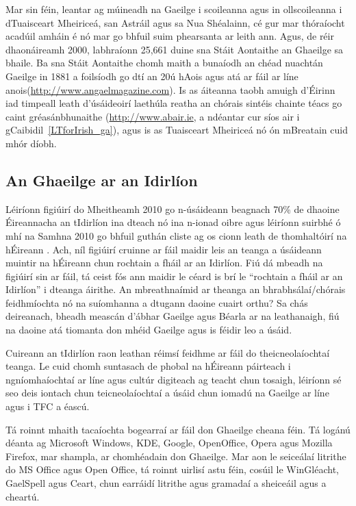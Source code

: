 \begin{multicols}{2}
Mar sin féin, leantar ag múineadh na Gaeilge i scoileanna agus in ollscoileanna i dTuaisceart Mheiriceá, san Astráil agus sa Nua Shéalainn, cé gur mar thóraíocht acadúil amháin é nó mar go bhfuil suim phearsanta ar leith ann. Agus, de réir dhaonáireamh 2000, labhraíonn 25,661 duine sna Stáit Aontaithe an Ghaeilge sa bhaile. Ba sna Stáit Aontaithe chomh maith a bunaíodh an chéad nuachtán Gaeilge in 1881 a foilsíodh go dtí an 20ú hAois agus atá ar fáil ar líne anois(\url{http://www.angaelmagazine.com}).  Is as áiteanna taobh amuigh d’Éirinn iad timpeall leath d’úsáideoirí laethúla reatha an chórais sintéis chainte téacs go caint gréasánbhunaithe (\url{http://www.abair.ie}, a ndéantar cur síos air i gCaibidil~\ref{LTforIrish_ga}), agus is as Tuaisceart Mheiriceá nó ón mBreatain cuid mhór díobh.

\subsection{An Ghaeilge ar an Idirlíon}

Léiríonn figiúirí do Mheitheamh 2010 go n-úsáideann beagnach 70\% de dhaoine Éireannacha an tIdirlíon ina dteach nó ina n-ionad oibre \cite{internetstats} agus léiríonn suirbhé ó mhí na Samhna 2010 go bhfuil guthán cliste ag os cionn leath de thomhaltóirí na hÉireann \cite{mindshare}. Ach, níl figiúirí cruinne ar fáil maidir leis an teanga a úsáideann muintir na hÉireann chun rochtain a fháil ar an Idirlíon. Fiú dá mbeadh na figiúirí sin ar fáil, tá ceist fós ann maidir le céard is brí le “rochtain a fháil ar an Idirlíon” i dteanga áirithe. An mbreathnaímid ar theanga an bhrabhsálaí/chórais feidhmíochta nó na suíomhanna a dtugann daoine cuairt orthu? Sa chás deireanach, bheadh meascán d’ábhar Gaeilge agus Béarla ar na leathanaigh, fiú na daoine atá tiomanta don mhéid Gaeilge agus is féidir leo a úsáid.

Cuireann an tIdirlíon raon leathan réimsí feidhme ar fáil do theicneolaíochtaí teanga. Le cuid chomh suntasach de phobal na hÉireann páirteach i ngníomhaíochtaí ar líne agus cultúr digiteach ag teacht chun tosaigh, léiríonn sé seo deis iontach chun teicneolaíochtaí a úsáid chun iomadú na Gaeilge ar líne agus i TFC a éascú.

Tá roinnt mhaith tacaíochta bogearraí ar fáil don Ghaeilge cheana féin.  Tá logánú déanta ag Microsoft Windows, KDE, Google, OpenOffice, Opera agus Mozilla Firefox, mar shampla, ar chomhéadain don Ghaeilge. Mar aon le seiceálaí litrithe do MS Office agus Open Office, tá roinnt uirlisí astu féin, cosúil le WinGléacht, GaelSpell agus Ceart, chun earráidí litrithe agus gramadaí a sheiceáil agus a cheartú. 


\end{multicols}
